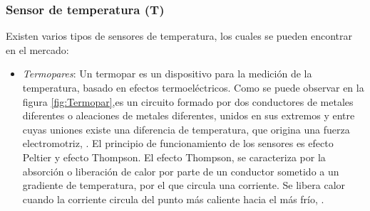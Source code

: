 \subsubsection{Sensor de temperatura (T)}
Existen varios tipos de sensores de temperatura, los cuales se pueden encontrar en el mercado: 
\begin{itemize}
    \item \textit{Termopares}: Un  termopar  es  un  dispositivo  para  la  medición  de  la  temperatura,  basado  en  efectos  termoeléctricos.  Como se puede observar en la figura \ref{fig:Termopar},es  un  circuito   formado   por   dos   conductores   de   metales   diferentes  o  aleaciones  de  metales  diferentes,  unidos  en  sus extremos y entre cuyas uniones existe una diferencia de temperatura, que origina una fuerza electromotriz, \cite{rodriguez_medicion_2007}. 
    El principio de funcionamiento de los sensores es efecto Peltier y efecto Thompson. El  efecto  Thompson,  se  caracteriza  por  la  absorci\'on  o  liberaci\'on de calor por parte de un conductor sometido a un  gradiente  de  temperatura,  por  el  que  circula  una  corriente.    Se  libera  calor  cuando  la  corriente  circula  del  punto m\'as caliente hacia el m\'as fr\'io, \cite{logvinov_principios_2007}.
    

\end{itemize}
